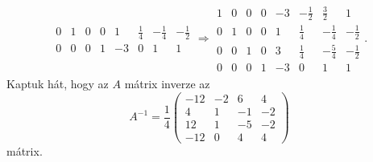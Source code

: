 \documentclass[a4paper, showtrims]{memoir}
\theoremstyle{plain}
\theoremstyle{remark}
\theoremstyle{definition}
\begin{document}
\begin{multline*}
\begin{array}{cccc|cccc}
		0 & 1 & 0 & 0 & 1  & \frac{1}{4}  & -\frac{1}{4} & -\frac{1}{2} \\
		0 & 0 & 0 & 1 & -3 & 0            & 1            & 1
	\end{array}\Rightarrow
	\begin{array}{cccc|cccc}
		1 & 0 & 0 & 0 & -3 & -\frac{1}{2} & \frac{3}{2}  & 1            \\
		0 & 1 & 0 & 0 & 1  & \frac{1}{4}  & -\frac{1}{4} & -\frac{1}{2} \\
		0 & 0 & 1 & 0 & 3  & \frac{1}{4}  & -\frac{5}{4} & -\frac{1}{2} \\
		0 & 0 & 0 & 1 & -3 & 0            & 1            & 1
	\end{array}.
\end{multline*}
Kaptuk hát, hogy az $A$ mátrix inverze az
\begin{displaymath}
	A^{-1}=\frac{1}{4}
	\begin{pmatrix}
		-12 & -2 & 6  & 4  \\
		4   & 1  & -1 & -2 \\
		12  & 1  & -5 & -2 \\
		-12 & 0  & 4  & 4
	\end{pmatrix}
\end{displaymath}
mátrix.
\end{document}
